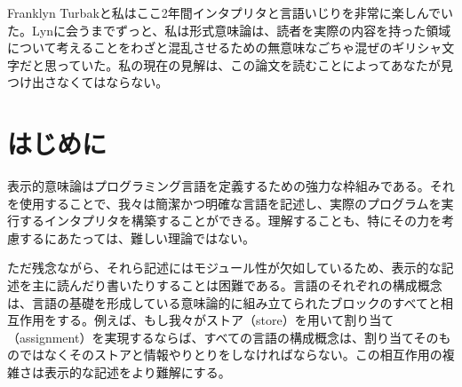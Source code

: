 \documentclass[11pt, oneside]{jsbook}   	%
\begin{document}
Franklyn Turbakと私はここ2年間インタプリタと言語いじりを非常に楽しんでいた。Lynに会うまでずっと、私は形式意味論は、読者を実際の内容を持った領域について考えることをわざと混乱させるための無意味なごちゃ混ぜのギリシャ文字だと思っていた。私の現在の見解は、この論文を読むことによってあなたが見つけ出さなくてはならない。
\newpage


\chapter{はじめに}
表示的意味論はプログラミング言語を定義するための強力な枠組みである。それを使用することで、我々は簡潔かつ明確な言語を記述し、実際のプログラムを実行するインタプリタを構築することができる。理解することも、特にその力を考慮するにあたっては、難しい理論ではない。

ただ残念ながら、それら記述にはモジュール性が欠如しているため、表示的な記述を主に読んだり書いたりすることは困難である。言語のそれぞれの構成概念は、言語の基礎を形成している意味論的に組み立てられたブロックのすべてと相互作用をする。例えば、もし我々がストア（store）を用いて割り当て（assignment）を実現するならば、すべての言語の構成概念は、割り当てそのものではなくそのストアと情報やりとりをしなければならない。この相互作用の複雑さは表示的な記述をより難解にする。
\end{document}
